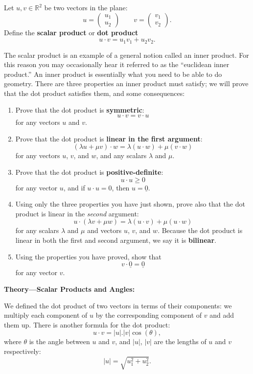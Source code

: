 \documentclass{article}
\let\uline\underline
\begin{document}
Let $u,v\in\mathbb{R}^2$ be two vectors in the plane:
\[u=\left(\begin{array}{c}u_1\\u_2\end{array}\right)\qquad v=\left(\begin{array}{c}v_1\\v_2\end{array}\right).\]
Define the \textbf{scalar product} or \textbf{dot product}
\[u\cdot v = u_1v_1+u_2v_2.\]

The scalar product is an example of a general notion called an inner product. For this reason you may occasionally hear it referred to as the ``euclidean inner product.'' An inner product is essentially what you need to be able to do geometry. There are three properties an inner product must satisfy; we will prove that the dot product satisfies them, and some consequences:

\begin{enumerate}
	\item Prove that the dot product is \textbf{symmetric}:
		\[u\cdot v=v\cdot u\]
		for any vectors $u$ and $v$.
	\item Prove that the dot product is \textbf{linear in the first argument}:
		\[(\lambda u+\mu v)\cdot w = \lambda(u\cdot w) + \mu(v\cdot w)\]
		for any vectors $u$, $v$, and $w$, and any scalars $\lambda$ and $\mu$.
	\item Prove that the dot product is \textbf{positive-definite}:
		\[u\cdot u\geq 0\]
		for any vector $u$, and if $u\cdot u=0$, then $u=\uline{0}$.
	\item Using only the three properties you have just shown, prove also that the dot product is linear in the \textit{second} argument:
		\[u\cdot(\lambda v+\mu w) = \lambda(u\cdot v) + \mu(u\cdot w)\]
		for any scalars $\lambda$ and $\mu$ and vectors $u$, $v$, and $w$. Because the dot product is linear in both the first and second argument, we say it is \textbf{bilinear}.
	\item Using the properties you have proved, show that
		\[v\cdot \uline{0}=\uline{0}\]
		for any vector $v$.
\end{enumerate}




\clearpage








\textbf{Theory---Scalar Products and Angles:}\bigskip


We defined the dot product of two vectors in terms of their components: we multiply each component of $u$ by the corresponding component of $v$ and add them up. There is another formula for the dot product:
\[u\cdot v = |u|.|v|\cos(\theta),\]
where $\theta$ is the angle between $u$ and $v$, and $|u|$, $|v|$ are the lengths of $u$ and $v$ respectively:
\[|u|=\sqrt{u_1^2+u_2^2}.\]
\end{document}

